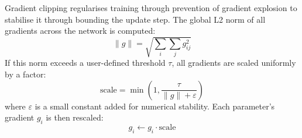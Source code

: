 \begin{tcolorbox}[title={\textbf{Lemma. Gradient clipping (global norm scaling)}}]
Gradient clipping regularises training through prevention of gradient explosion to stabilise it through bounding the update step. The global L2 norm of all gradients across the network is computed:
\[
\lVert g \rVert = \sqrt{ \sum_i \sum_j g_{ij}^2 }
\]
If this norm exceeds a user-defined threshold \( \tau \), all gradients are scaled uniformly by a factor:
\[
\text{scale} = \min\left(1, \frac{\tau}{\lVert g \rVert + \varepsilon} \right)
\]
where \( \varepsilon \) is a small constant added for numerical stability. Each parameter's gradient \( g_i \) is then rescaled:
\[
g_i \leftarrow g_i \cdot \text{scale}
\]
\end{tcolorbox}

